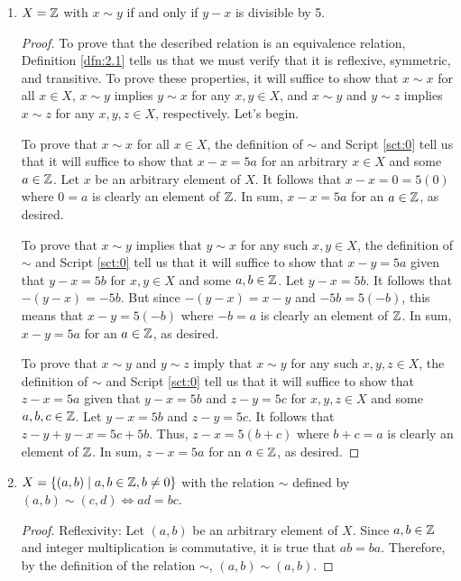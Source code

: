 \documentclass[../main.tex]{subfiles}
\begin{document}
\begin{exercise}
\begin{enumerate}[label={\alph*)},ref={\theexercise\alph*}]
\begin{proof}
        \end{proof}
        \item \label{exr:2.2d}$X=\mathbb{Z}$ with $x\sim y$ if and only if $y-x$ is divisible by 5.
        \begin{proof}
            To prove that the described relation is an equivalence relation, Definition \ref{dfn:2.1} tells us that we must verify that it is reflexive, symmetric, and transitive. To prove these properties, it will suffice to show that $x\sim x$ for all $x\in X$, $x\sim y$ implies $y\sim x$ for any $x,y\in X$, and $x\sim y$ and $y\sim z$ implies $x\sim z$ for any $x,y,z\in X$, respectively. Let's begin.\par
            To prove that $x\sim x$ for all $x\in X$, the definition of $\sim$ and Script \ref{sct:0} tell us that it will suffice to show that $x-x=5a$ for an arbitrary $x\in X$ and some $a\in\mathbb{Z}$. Let $x$ be an arbitrary element of $X$. It follows that $x-x=0=5(0)$ where $0=a$ is clearly an element of $\mathbb{Z}$. In sum, $x-x=5a$ for an $a\in\mathbb{Z}$, as desired.\par
            To prove that $x\sim y$ implies that $y\sim x$ for any such $x,y\in X$, the definition of $\sim$ and Script \ref{sct:0} tell us that it will suffice to show that $x-y=5a$ given that $y-x=5b$ for $x,y\in X$ and some $a,b\in\mathbb{Z}$. Let $y-x=5b$. It follows that $-(y-x)=-5b$. But since $-(y-x)=x-y$ and $-5b=5(-b)$, this means that $x-y=5(-b)$ where $-b=a$ is clearly an element of $\mathbb{Z}$. In sum, $x-y=5a$ for an $a\in\mathbb{Z}$, as desired.\par
            To prove that $x\sim y$ and $y\sim z$ imply that $x\sim y$ for any such $x,y,z\in X$, the definition of $\sim$ and Script \ref{sct:0} tell us that it will suffice to show that $z-x=5a$ given that $y-x=5b$ and $z-y=5c$ for $x,y,z\in X$ and some $a,b,c\in\mathbb{Z}$. Let $y-x=5b$ and $z-y=5c$. It follows that $z-y+y-x=5c+5b$. Thus, $z-x=5(b+c)$ where $b+c=a$ is clearly an element of $\mathbb{Z}$. In sum, $z-x=5a$ for an $a\in\mathbb{Z}$, as desired.
        \end{proof}
        \item \label{exr:2.2e}$X=\{(a,b)\mid a,b\in\mathbb{Z},b\neq 0\}$ with the relation $\sim$ defined by $(a,b)\sim(c,d)\Longleftrightarrow ad=bc$.
        \begin{proof}
            Reflexivity: Let $(a,b)$ be an arbitrary element of $X$. Since $a,b\in\mathbb{Z}$ and integer multiplication is commutative, it is true that $ab=ba$. Therefore, by the definition of the relation $\sim$, $(a,b)\sim(a,b)$.\par

\end{proof}
\end{enumerate}
\end{exercise}
\end{document}
